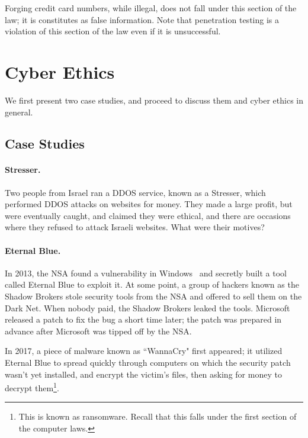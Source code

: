 Forging credit card numbers, while illegal, does not fall under this section of
the law; it is constitutes as false information. Note that penetration testing
is a violation of this section of the law even if it is unsuccessful.

\section{Cyber Ethics}\label{sec:cyber_ethics}

We first present two case studies, and proceed to discuss them and cyber ethics
in general.

\subsection{Case Studies}

\paragraph{Stresser.} Two people from Israel ran a DDOS service, known as a
Stresser, which performed DDOS attacks on websites for money. They made a large
profit, but were eventually caught, and claimed they were ethical, and there are
occasions where they refused to attack Israeli websites. What were their
motives?

\paragraph{Eternal Blue.} In 2013, the NSA found a vulnerability in
Windows~\cite{CVE-2017-0144} and secretly built a tool called Eternal Blue to
exploit it. At some point, a group of hackers known as the Shadow Brokers stole
security tools from the NSA and offered to sell them on the Dark Net. When
nobody paid, the Shadow Brokers leaked the tools. Microsoft released a patch to
fix the bug a short time later; the patch was prepared in advance after
Microsoft was tipped off by the NSA.

In 2017, a piece of malware known as ``WannaCry" first appeared; it utilized
Eternal Blue to spread quickly through computers on which the security patch
wasn't yet installed, and encrypt the victim's files, then asking for money to
decrypt them\footnote{This is known as ransomware. Recall that this falls under
the first section of the computer laws.}.

